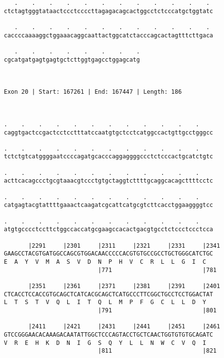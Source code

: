 \documentclass{article}
\begin{document}
\begin{Verbatim}
   .    .    .    .    .    .    .    .    .    .    .    . 
ctctagtgggtataactccctccccttagagacagcactggcctctcccatgctggtatc
                                                            
   .    .    .    .    .    .    .    .    .    .    .    . 
caccccaaaaggctggaaacaggcaattactggcatctacccagcactagtttcttgaca
                                                            
   .    .    .    .    .    .    .    .
cgcatgatgagtgagtgctcttggtgagcctggagcatg
                                       
                                       
 
Exon 20 | Start: 167261 | End: 167447 | Length: 186



.    .    .    .    .    .    .    .    .    .    .    .    
caggtgactccgactcctcctttatccaatgtgctcctcatggccactgttgcctgggcc
                                                            
.    .    .    .    .    .    .    .    .    .    .    .    
tctctgtcatggggaatccccagatgcacccaggaggggccctctcccactgcatctgtc
                                                            
.    .    .    .    .    .    .    .    .    .    .    .    
acttcacagccctgcgtaaacgtccctgtgctaggtcttttgcaggcacagcttttcctc
                                                            
.    .    .    .    .    .    .    .    .    .    .    .    
catgagtacgtattttgaaactcaagatcgcattcatgcgtcttcacctggaaggggtcc
                                                            
.    .    .    .    .    .    .    .    .    .    .    .    
atgtgcccctccttctggccaccatgcgaagccacactgacgtgcctctccctccctcca
                                                            
       |2291     |2301     |2311     |2321     |2331     |2341
GAAGCCTACGTGATGGCCAGCGTGGACAACCCCCACGTGTGCCGCCTGCTGGGCATCTGC
E  A  Y  V  M  A  S  V  D  N  P  H  V  C  R  L  L  G  I  C  
                           |771                          |781
  
       |2351     |2361     |2371     |2381     |2391     |2401
CTCACCTCCACCGTGCAGCTCATCACGCAGCTCATGCCCTTCGGCTGCCTCCTGGACTAT
L  T  S  T  V  Q  L  I  T  Q  L  M  P  F  G  C  L  L  D  Y  
                           |791                          |801
  
       |2411     |2421     |2431     |2441     |2451     |2461
GTCCGGGAACACAAAGACAATATTGGCTCCCAGTACCTGCTCAACTGGTGTGTGCAGATC
V  R  E  H  K  D  N  I  G  S  Q  Y  L  L  N  W  C  V  Q  I  
                           |811                          |821
  

\end{Verbatim}
\end{document}
